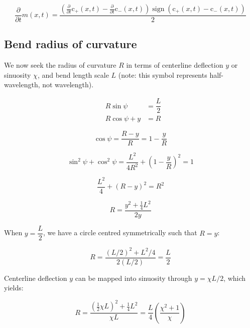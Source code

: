 \documentclass[11pt]{article}
\begin{document}
    $$\frac{\partial}{\partial t} m{\left (x,t \right )} = \frac{\left(\frac{\partial}{\partial t} \operatorname{c_{+}}{\left (x,t \right )} - \frac{\partial}{\partial t} \operatorname{c_{-}}{\left (x,t \right )}\right) \operatorname{sign}{\left (\operatorname{c_{+}}{\left (x,t \right )} - \operatorname{c_{-}}{\left (x,t \right )} \right )}}{2}$$

    

    \subsection{Bend radius of curvature}\label{bend-radius-of-curvature}

    We now seek the radius of curvature \(R\) in terms of centerline
deflection \(y\) or sinuosity \(\chi\), and bend length scale \({L}\)
(note: this symbol represents half-wavelength, not wavelength).

\begin{eqnarray}
    &R \sin\psi &= \dfrac{{L}}{2} \\
    &R \cos\psi +y &= R 
\end{eqnarray}

\begin{equation}
    \cos\psi = \dfrac{R-y}{R} = 1-\dfrac{y}{R}
\end{equation}

\begin{equation}
    \sin^2\psi + \cos^2\psi
    = \dfrac{{L}^2}{4R^2} + \left(1-\dfrac{y}{R}\right)^2
    = 1
\end{equation}

\begin{equation}
    \dfrac{{L}^2}{4} + (R-y)^2 = R^2
\end{equation}

\begin{equation}
    R = \dfrac{y^2+\tfrac{1}{4}{L}^2}{2y} 
\end{equation}

When \(y=\dfrac{{L}}{2}\), we have a circle centred symmetrically such
that \(R=y\):

\begin{equation}
    R = \dfrac{({L}/2)^2+{L}^2/4}{2({L}/2)} 
    = \dfrac{{L}}{2}
\end{equation}

Centerline deflection \(y\) can be mapped into sinuosity through
\(y = \chi{L}/2\), which yields:

\begin{equation}
    R = \dfrac{\left(\tfrac{1}{2}\chi{L}\right)^2+\tfrac{1}{4}{L}^2}{\chi{L}} 
    = \dfrac{{L}}{4} \left(\dfrac{\chi^2+1}{\chi} \right)
\end{equation}
\end{document}
